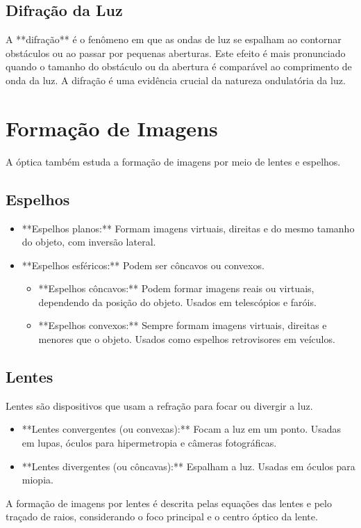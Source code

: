 \documentclass{article}
\begin{document}
\subsection{Difração da Luz}

A **difração** é o fenômeno em que as ondas de luz se espalham ao contornar obstáculos ou ao passar por pequenas aberturas. Este efeito é mais pronunciado quando o tamanho do obstáculo ou da abertura é comparável ao comprimento de onda da luz. A difração é uma evidência crucial da natureza ondulatória da luz.

\section{Formação de Imagens}

A óptica também estuda a formação de imagens por meio de lentes e espelhos.

\subsection{Espelhos}
\begin{itemize}
    \item **Espelhos planos:** Formam imagens virtuais, direitas e do mesmo tamanho do objeto, com inversão lateral.
    \item **Espelhos esféricos:** Podem ser côncavos ou convexos.
    \begin{itemize}
        \item **Espelhos côncavos:** Podem formar imagens reais ou virtuais, dependendo da posição do objeto. Usados em telescópios e faróis.
        \item **Espelhos convexos:** Sempre formam imagens virtuais, direitas e menores que o objeto. Usados como espelhos retrovisores em veículos.
    \end{itemize}
\end{itemize}

\subsection{Lentes}
Lentes são dispositivos que usam a refração para focar ou divergir a luz.
\begin{itemize}
    \item **Lentes convergentes (ou convexas):** Focam a luz em um ponto. Usadas em lupas, óculos para hipermetropia e câmeras fotográficas.
    \item **Lentes divergentes (ou côncavas):** Espalham a luz. Usadas em óculos para miopia.
\end{itemize}
A formação de imagens por lentes é descrita pelas equações das lentes e pelo traçado de raios, considerando o foco principal e o centro óptico da lente.
\end{document}
